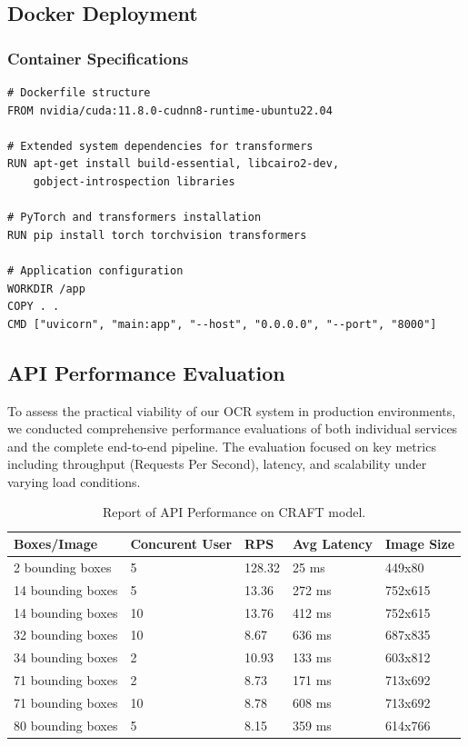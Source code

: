 {\subsection{Docker Deployment}
\label{subsec:trocr-docker}

\subsubsection*{Container Specifications}

\begin{verbatim}
# Dockerfile structure
FROM nvidia/cuda:11.8.0-cudnn8-runtime-ubuntu22.04

# Extended system dependencies for transformers
RUN apt-get install build-essential, libcairo2-dev, 
    gobject-introspection libraries

# PyTorch and transformers installation
RUN pip install torch torchvision transformers

# Application configuration
WORKDIR /app
COPY . .
CMD ["uvicorn", "main:app", "--host", "0.0.0.0", "--port", "8000"]
\end{verbatim}


\subsection{API Performance Evaluation}
\label{subsec:api-performance-evaluation}


To assess the practical viability of our OCR system in production environments, we conducted 
comprehensive performance evaluations of both individual services and the complete end-to-end 
pipeline. The evaluation focused on key metrics including throughput (Requests Per Second), 
latency, and scalability under varying load conditions.


\begin{table}[H]
    \centering
    \caption{Report of API Performance on CRAFT model. }
    \renewcommand{\arraystretch}{1.5}
    \begin{tabular}{|p{3.5cm}|p{3.5cm}|p{1.5cm}|p{3.0cm}|p{2.7cm}|}
    \hline
    \textbf{Boxes/Image} & \textbf{Concurent User} & \textbf{RPS} & \textbf{Avg Latency} & \textbf{Image Size}\\
    \hline
    2 bounding boxes & 5 & 128.32 & 25 ms & 449x80\\
    \hline
    14 bounding boxes & 5 & 13.36 & 272 ms & 752x615\\
    \hline
    14 bounding boxes & 10 & 13.76 & 412 ms & 752x615\\
    \hline
    32 bounding boxes & 10 & 8.67 & 636 ms & 687x835\\
    \hline
    34 bounding boxes & 2 & 10.93 & 133 ms & 603x812\\
    \hline
    71 bounding boxes & 2 & 8.73 & 171 ms  & 713x692\\
    \hline
    71 bounding boxes & 10 & 8.78 & 608 ms & 713x692\\
    \hline
    80 bounding boxes & 5 & 8.15 & 359 ms & 614x766\\
    \hline
    \end{tabular}
    \label{tab:api_craft_performance_evaluation}
\end{table}


}
